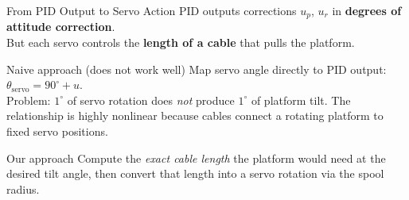 \documentclass[10pt]{beamer}
\begin{document}
\begin{frame}{From PID Output to Servo Action}
  PID outputs corrections $u_p$, $u_r$ in \textbf{degrees of attitude correction}.\\
  But each servo controls the \textbf{length of a cable} that pulls the platform.

  \begin{block}{Naive approach (does not work well)}
    Map servo angle directly to PID output: $\theta_{\text{servo}} = 90^\circ + u$.\\
    Problem: $1^\circ$ of servo rotation does \emph{not} produce $1^\circ$ of platform tilt.
    The relationship is highly nonlinear because cables connect a rotating platform to fixed servo positions.
  \end{block}

  \begin{block}{Our approach}
    Compute the \emph{exact cable length} the platform would need at the desired tilt angle, then convert that length into a servo rotation via the spool radius.
  \end{block}
\end{frame}
\end{document}
